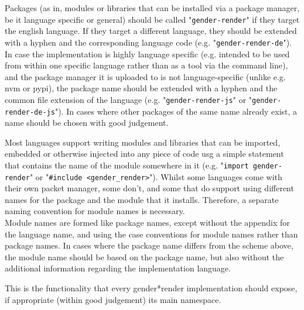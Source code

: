 \documentclass{article}
\newcommand{\GenderRender}{
    gender*render
}
\newcounter{subsubsubsection}[subsubsection]
\begin{document}
    Packages (as in, modules or libraries that can be installed via a package manager, be it language specific or general) should be called "\texttt{gender-render}" if they target the english language.
    If they target a different language, they should be extended with a hyphen and the corresponding language code (e.g. "\texttt{gender-render-de}").
    In case the implementation is highly language specific (e.g. intended to be used from within one specific language rather than as a tool via the command line), and the package manager it is uploaded to is not language-specific (unlike e.g. nvm or pypi), the package name should be extended with a hyphen and the common file extension of the language (e.g. "\texttt{gender-render-js}" or "\texttt{gender-render-de-js}").
    In cases where other packages of the same name already exist, a name should be chosen with good judgement.


    Most languages support writing modules and libraries that can be imported, embedded or otherwise injected into any piece of code usg a simple statement that contains the name of the module somewhere in it (e.g. "\texttt{import gender-render}" or "\texttt{\#include <gender\_render>}").
    Whilst some languages come with their own packet manager, some don't, and some that do support using different names for the package and the module that it installs.
    Therefore, a separate naming convention for module names is necessary.\\

    Module names are formed like package names, except without the appendix for the language name, and using the case conventions for module names rather than package names.
    In cases where the package name differs from the scheme above, the module name should be based on the package name, but also without the additional information regarding the implementation language.


    This is the functionality that every \GenderRender implementation should expose, if appropriate (within good judgement) its main namespace.\\
\end{document}
